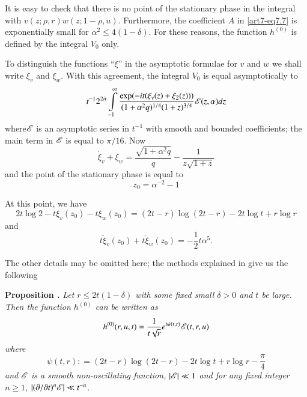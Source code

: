 It is easy to check that there is no point of the stationary phase in the integral with $v (z; \rho, r) w (z; 1 - \rho, u)$. Furthermore, the coefficient $A$ in \eqref{art7-eq7.7} is exponentially small for $\alpha^2 \leqslant 4 (1 - \delta)$. For these reasons, the function $h^{(0)}$ is defined by the integral $V_0$ only. 

To distinguish the functions ``$\xi$'' in the asymptotic formulae for $v$ and $w$ we shall write $\xi_v$ and $\xi_w$. With this agreement, the integral $V_0$ is equal asymptotically to 
\setcounter{section}{7}
\begin{gather}
t^{-1} 2^{2it} \int\limits^\infty_{-1} \frac{\exp (-it (\xi_v (z) + \xi_2 (z)))}{(1+ \alpha^2 q)^{1/4} (1+z)^{3/4}} \mathscr{E} (z, \alpha) d z \label{art7-eq7.36}
\end{gather}
where\pageoriginale $\mathscr{E}$ is an asymptotic series in $t^{-1}$ with smooth and bounded coefficients; the main term in $\mathscr{E}$ is equal to $\pi/16$. Now
$$
\dot{\xi}_v + \xi_w = \frac{\sqrt{1+\alpha^2 q}}{q} - \frac{1}{z\sqrt{1+z}} 
$$
and the point of the stationary phase is equal to 
\begin{equation}
z_0 = \alpha^{-2} -1 \label{art7-eq7.37}
\end{equation}

At this point, we have 
\begin{equation}
2 t \log 2 - t \xi_v (z_0) - t \xi_w (z_0) = (2 t - r) \log (2t - r) - 2 t \log t + r \log r \label{art7-eq7.38}
\end{equation}
and 
\begin{equation}
t \ddot{\xi}_v (z_0) + t \ddot{\xi}_w (z_0) = - \frac{1}{2} t \alpha^5 . \label{art7-eq7.39}
\end{equation}

The other details may be omitted here; the methods explained in \cite{art7-key6} give us the following 

\medskip
\noindent
{\bfseries Proposition .\label{art7-prop11}}
\textit{Let $r \leqslant 2t (1-\delta)$ with some fixed small $\delta > 0$ and $t$ be large. Then the function $h^{(0)}$ can be written as}
\begin{equation}
h^{(0)} (r, u, t) = \frac{1}{t\sqrt{r}} e^{i\psi (t, r)} \mathscr{E} (t, r, u) \label{art7-eq7.40}
\end{equation}
\textit{where}
\begin{equation}
\psi (t, r) : = (2t -r) \log (2t -r) - 2t \log t + r \log r - \frac{\pi}{4} \label{art7-eq7.41}
\end{equation}
\textit{and $\mathscr{E}$ is a smooth non-oscillating function, $|\mathscr{E}| \ll 1$ and for any fixed integer $n \geqslant 1$, $|(\partial / \partial t)^n \mathscr{E}| \ll t^{-n}$.} 

